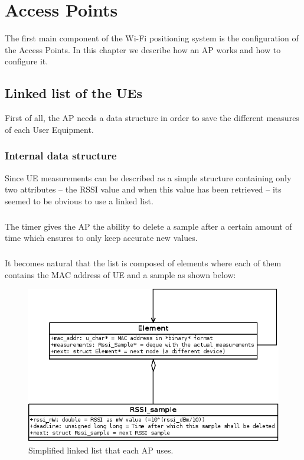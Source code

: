 \chapter{Access Points}

The first main component of the Wi-Fi positioning system is the configuration
of the Access Points. In this chapter we describe how an AP works and how to
configure it.

\section{Linked list of the UEs}

First of all, the AP needs a data structure in order to save the different
measures of each User Equipment.

\subsection{Internal data structure}

Since UE measurements can be described as a simple structure containing only
two attributes -- the RSSI value and when this value has been retrieved -- its
seemed to be obvious to use a linked list.

\paragraph{}
The timer gives the AP the ability to delete a sample after a certain amount of
time which ensures to only keep accurate new values.

\paragraph{}
It becomes natural that the list is composed of elements where each of them
contains the MAC address of UE and a sample as shown below:

\begin{figure}[H]
  \centering
  \includegraphics[scale=.6]{./ap/ap_list.png}
  \caption{Simplified linked list that each AP uses.}
\end{figure}

